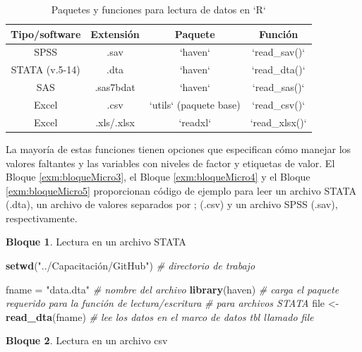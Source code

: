 \documentclass[]{book}
\newenvironment{Shaded}{\begin{snugshade}}{\end{snugshade}}
\newcommand{\CommentTok}[1]{\textcolor[rgb]{0.56,0.35,0.01}{\textit{#1}}}
\newcommand{\KeywordTok}[1]{\textcolor[rgb]{0.13,0.29,0.53}{\textbf{#1}}}
\newcommand{\NormalTok}[1]{#1}
\newcommand{\StringTok}[1]{\textcolor[rgb]{0.31,0.60,0.02}{#1}}
\theoremstyle{definition}
\theoremstyle{definition}
\newtheorem{example}{Bloque}[chapter]
\theoremstyle{definition}
\theoremstyle{definition}
\theoremstyle{remark}
\begin{document}
\begin{table}

\caption{\label{tab:tabMicro1}Paquetes y funciones para lectura de datos en `R`}
\centering
\begin{tabular}[t]{c|c|c|c}
\hline
Tipo/software & Extensión & Paquete & Función\\
\hline
SPSS & .sav & `haven` & `read\_sav()`\\
\hline
STATA (v.5-14) & .dta & `haven` & `read\_dta()`\\
\hline
SAS & .sas7bdat & `haven` & `read\_sas()`\\
\hline
Excel & .csv & `utils` (paquete base) & `read\_csv()`\\
\hline
Excel & .xls/.xlsx & `readxl` & `read\_xlsx()`\\
\hline
\end{tabular}
\end{table}

La mayoría de estas funciones tienen opciones que especifican cómo manejar los valores faltantes y las variables con niveles de factor y etiquetas de valor. El Bloque \ref{exm:bloqueMicro3}, el Bloque \ref{exm:bloqueMicro4} y el Bloque \ref{exm:bloqueMicro5} proporcionan código de ejemplo para leer un archivo STATA (.dta), un archivo de valores separados por ; (.csv) y un archivo SPSS (.sav), respectivamente.

\begin{example}
\protect\hypertarget{exm:bloqueMicro3}{}{\label{exm:bloqueMicro3} }Lectura en un archivo STATA
\end{example}

\begin{Shaded}
\begin{Highlighting}[]
\KeywordTok{setwd}\NormalTok{(}\StringTok{"../Capacitación/GitHub"}\NormalTok{) }\CommentTok{# directorio de trabajo}


\NormalTok{fname =}\StringTok{ "data.dta"} \CommentTok{# nombre del archivo}
\KeywordTok{library}\NormalTok{(haven) }\CommentTok{# carga el paquete requerido para la función de lectura/escritura}
               \CommentTok{# para archivos STATA}
\NormalTok{file <-}\StringTok{ }\KeywordTok{read_dta}\NormalTok{(fname)}
\CommentTok{# lee los datos en el marco de datos tbl llamado file}
\end{Highlighting}
\end{Shaded}

\begin{example}
\protect\hypertarget{exm:bloqueMicro4}{}{\label{exm:bloqueMicro4} }Lectura en un archivo csv
\end{example}
\end{document}
